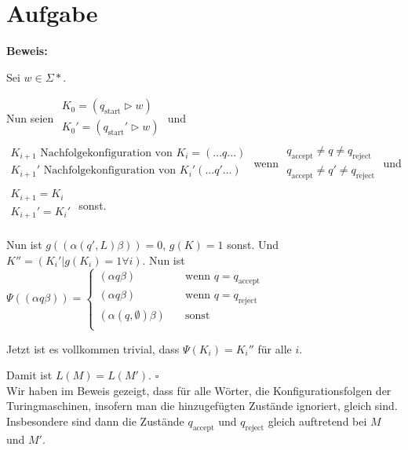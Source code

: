 \documentclass{article}
\newcounter{AufgabenCounter}
\newcounter{TeilaufgabenCounter}
\newenvironment{aufgabe}{\section*{Aufgabe \theAufgabenCounter}\setcounter{TeilaufgabenCounter}{1}}{\stepcounter{AufgabenCounter}}
\newcommand{\qed}{\hfill$\square$}
\begin{document}
\begin{aufgabe}
  \textbf{Beweis:}

  Sei $w\in\Sigma*$.

  Nun seien $\begin{aligned}
      K_0=(q_{\text{start}}\triangleright w)   \\
      K_0'=(q_{\text{start}}'\triangleright w) \\
    \end{aligned}$ und $\begin{aligned}
      K_{i+1}\text{ Nachfolgekonfiguration von }K_i=(...q...)   \\
      K_{i+1}'\text{ Nachfolgekonfiguration von }K_i'(...q'...) \\
    \end{aligned}$ wenn $\begin{aligned}
      q_\text{accept}\neq q\neq q_\text{reject}  \\
      q_\text{accept}\neq q'\neq q_\text{reject} \\
    \end{aligned}$ und $\begin{aligned}
      K_{i+1}=K_i   \\
      K_{i+1}'=K_i' \\
    \end{aligned}$ sonst.

  Nun ist $g((\alpha(q',L)\beta))=0$, $g(K)=1$ sonst.
  Und $K''=(K_i'|g(K_i)=1\forall i)$.
  Nun ist $\Psi((\alpha q\beta))=\left\{\begin{aligned}
      (\alpha q\beta)             & \quad\text{wenn }q=q_\text{accept} \\
      (\alpha q\beta)             & \quad\text{wenn }q=q_\text{reject} \\
      (\alpha (q,\emptyset)\beta) & \quad\text{sonst}                  \\
    \end{aligned}\right.$

  Jetzt ist es vollkommen trivial, dass $\Psi(K_i)=K_i''$ für alle $i$.

  Damit ist $L(M)=L(M')$. \qed
  \\

  Wir haben im Beweis gezeigt, dass für alle Wörter, die Konfigurationsfolgen der Turingmaschinen, insofern man die hinzugefügten Zustände ignoriert, gleich sind.\\

  Insbesondere sind dann die Zustände $q_\text{accept}$ und $q_\text{reject}$ gleich auftretend bei $M$ und $M'$.\\
\end{aufgabe}
\end{document}
